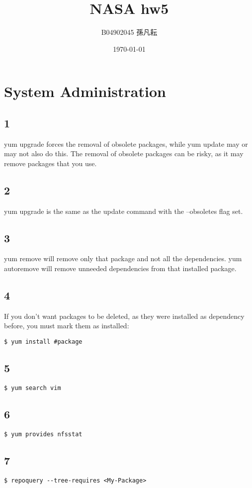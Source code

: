 \documentclass{article}
\title{NASA hw5}
\author{B04902045 孫凡耘}
\date{\today}
\begin{document}
\maketitle
    \section{System Administration}
    \subsection{1}
    yum upgrade forces the removal of obsolete packages, while yum update may or may not also do this. The removal of obsolete packages can be risky, as it may remove packages that you use. \newline
    \subsection{2}
    yum upgrade is the same as the update command with the --obsoletes flag set.
    \subsection{3}
    yum remove will remove only that package and not all the dependencies.\newline
    yum autoremove will remove unneeded dependencies from that installed package.
    \subsection{4}
    If you don't want packages to be deleted, as they were installed as dependency before, you must mark them as installed:
    \begin{verbatim}$ yum install #package\end{verbatim}
    \subsection{5}
    \begin{verbatim}$ yum search vim \end{verbatim}
    \subsection{6}
    \begin{verbatim}$ yum provides nfsstat\end{verbatim}
    \subsection{7}
    \begin{verbatim}$ repoquery --tree-requires <My-Package>\end{verbatim}
\end{document}

